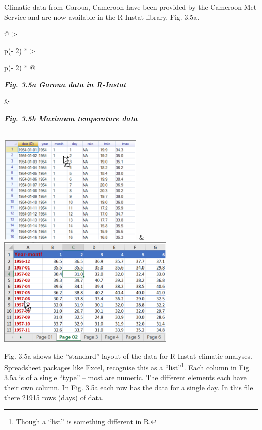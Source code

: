 \documentclass[
  letterpaper,
  DIV=11,
  numbers=noendperiod]{scrreprt}
\begin{document}
Climatic data from Garoua, Cameroon have been provided by the Cameroon
Met Service and are now available in the R-Instat library, Fig. 3.5a.

\begin{longtable}[]{@{}
  >{\raggedright\arraybackslash}p{(\columnwidth - 2\tabcolsep) * }
  >{\raggedright\arraybackslash}p{(\columnwidth - 2\tabcolsep) * }@{}}
\toprule\noalign{}
\begin{minipage}[b]{\linewidth}\raggedright
\textbf{\emph{Fig. 3.5a Garoua data in R-Instat}}
\end{minipage} & \begin{minipage}[b]{\linewidth}\raggedright
\textbf{\emph{Fig. 3.5b Maximum temperature data}}
\end{minipage} \\
\midrule\noalign{}
\endhead
\bottomrule\noalign{}
\endlastfoot
\includegraphics[width=2.74137in,height=2.05602in]{figures/Fig3.5a.png}
&
\includegraphics[width=3.35332in,height=2.04787in]{figures/Fig3.5b.png} \\
\end{longtable}

Fig. 3.5a shows the ``standard'' layout of the data for R-Instat
climatic analyses. Spreadsheet packages like Excel, recognise this as a
``list''\footnote{Though a ``list'' is something different in R.}. Each
column in Fig. 3.5a is of a single ``type'' -- most are numeric. The
different elements each have their own column. In Fig. 3.5a each row has
the data for a single day. In this file there 21915 rows (days) of data.
\end{document}
